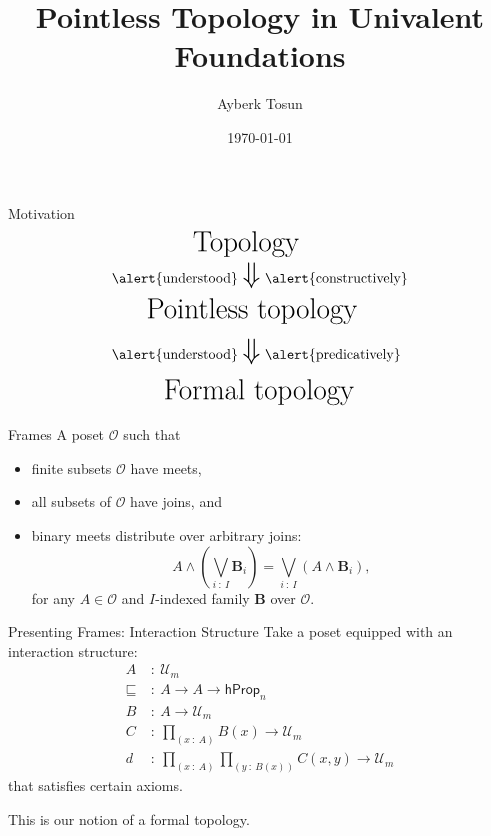 \documentclass{beamer}
\title{Pointless Topology in Univalent Foundations}
\date{\today}
\author{Ayberk Tosun}
\institute{Chalmers University of Technology}
\newcommand{\pity}[3]{\prod_{(#1~:~#2)} #3}
\newcommand{\univ}{\mathcal{U}}
\begin{document}
\maketitle

\begin{frame}{Motivation}
  \begin{align*}
    \text{{\huge Top}}&\text{{\huge ology}}\\
    \text{\alert{understood}} &~\text{\huge $\Downarrow$}~\text{\alert{constructively}} \\
    \text{{\huge Pointles}}&\text{{\huge s~topology}}\\
    \text{\alert{understood}} &~\text{\huge $\Downarrow$}~\text{\alert{predicatively}} \\
    \text{{\huge Forma}}&\text{{\huge l~topology}}\\
  \end{align*}
\end{frame}

\begin{frame}{Frames}
  A poset $\mathcal{O}$ such that
  \begin{itemize}
    \item \alert{finite subsets} $\mathcal{O}$ have \alert{meets},
    \item \alert{all subsets} of $\mathcal{O}$ have \alert{joins}, and
    \item binary meets distribute over arbitrary joins:
      \begin{equation*}
        A \wedge \left( \bigvee_{i~:~I} \mathbf{B}_i \right) = \bigvee_{i~:~I} \left( A \wedge \mathbf{B}_i \right),
      \end{equation*}
      for any $A \in \mathcal{O}$ and $I$-indexed family $\mathbf{B}$ over $\mathcal{O}$.
  \end{itemize}
\end{frame}

\begin{frame}{Presenting Frames: Interaction Structure}
  Take a poset equipped with an \alert{interaction structure}:
  \begin{align*}
    A ~&:~ \univ{}_m \\
    \sqsubseteq ~&:~ A \rightarrow A \rightarrow \mathsf{hProp}_n\\
    B ~&:~ A \rightarrow \univ{}_m\\
    C ~&:~ \pity{x}{A}{B(x) \rightarrow \univ{}_m}\\
    d ~&:~ \pity{x}{A}{\pity{y}{B(x)}{C(x, y) \rightarrow \univ{}_m}}
  \end{align*}
  that satisfies certain axioms.

  This is our notion of a \alert{formal topology}.
\end{frame}
\end{document}
